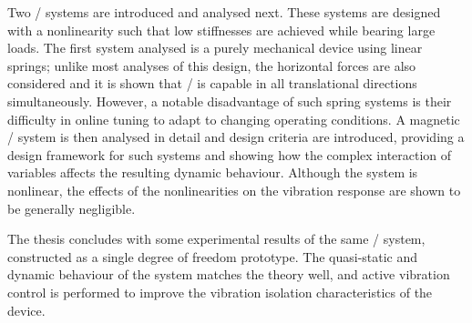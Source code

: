 \documentclass[10pt,a4paper]{memoir}
\begin{document}
Two \qzs/ systems are introduced and analysed next.
These systems are designed with a nonlinearity such that low stiffnesses are achieved while bearing large loads.
The first system analysed is a purely mechanical device using linear springs; unlike most analyses of this design, the horizontal forces are also considered and it is shown that \qzs/ is capable in all translational directions simultaneously.
However, a notable disadvantage of such spring systems is their difficulty in online tuning to adapt to changing operating conditions.
A magnetic \qzs/ system is then analysed in detail and design criteria are introduced, providing a design framework for such systems and showing how the complex interaction of variables affects the resulting dynamic behaviour.
Although the system is nonlinear, the effects of the nonlinearities on the vibration response are shown to be generally negligible.

The thesis concludes with some experimental results of the same \qzs/ system, constructed as a single degree of freedom prototype.
The quasi-static and dynamic behaviour of the system matches the theory well, and active vibration control is performed to improve the vibration isolation characteristics of the device.
\end{document}
